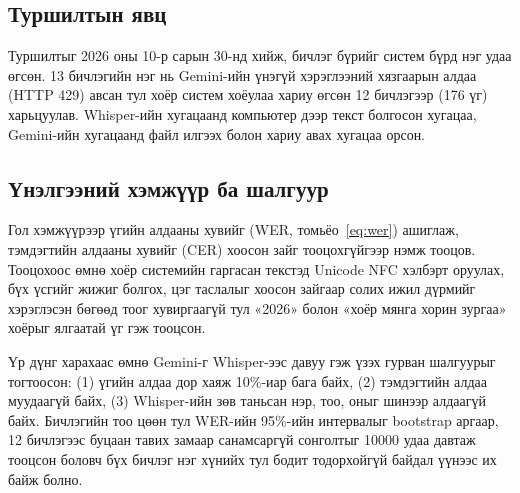 \subsection{Туршилтын явц}
\label{sec:stt-procedure}

Туршилтыг 2026 оны 10-р сарын 30-нд хийж, бичлэг бүрийг систем бүрд нэг удаа өгсөн. 13 бичлэгийн нэг нь Gemini-ийн үнэгүй хэрэглээний хязгаарын алдаа (HTTP 429) авсан тул хоёр систем хоёулаа хариу өгсөн 12 бичлэгээр (176 үг) харьцуулав. Whisper-ийн хугацаанд компьютер дээр текст болгосон хугацаа, Gemini-ийн хугацаанд файл илгээх болон хариу авах хугацаа орсон.

\subsection{Үнэлгээний хэмжүүр ба шалгуур}
\label{sec:stt-metrics}
\label{sec:stt-criteria}
\label{sec:stt-ci}

Гол хэмжүүрээр үгийн алдааны хувийг (\acs{WER}, томьёо~\ref{eq:wer}) ашиглаж, тэмдэгтийн алдааны хувийг (\acs{CER}) хоосон зайг тооцохгүйгээр нэмж тооцов. Тооцохоос өмнө хоёр системийн гаргасан текстэд Unicode NFC хэлбэрт оруулах, бүх үсгийг жижиг болгох, цэг таслалыг хоосон зайгаар солих ижил дүрмийг хэрэглэсэн бөгөөд тоог хувиргаагүй тул «2026» болон «хоёр мянга хорин зургаа» хоёрыг ялгаатай үг гэж тооцсон.

Үр дүнг харахаас өмнө Gemini-г Whisper-ээс давуу гэж үзэх гурван шалгуурыг тогтоосон: (1) үгийн алдаа дор хаяж 10\%-иар бага байх, (2) тэмдэгтийн алдаа муудаагүй байх, (3) Whisper-ийн зөв таньсан нэр, тоо, оныг шинээр алдаагүй байх. Бичлэгийн тоо цөөн тул \acs{WER}-ийн 95\%-ийн интервалыг bootstrap аргаар, 12 бичлэгээс буцаан тавих замаар санамсаргүй сонголтыг 10000 удаа давтаж тооцсон боловч бүх бичлэг нэг хүнийх тул бодит тодорхойгүй байдал үүнээс их байж болно.

